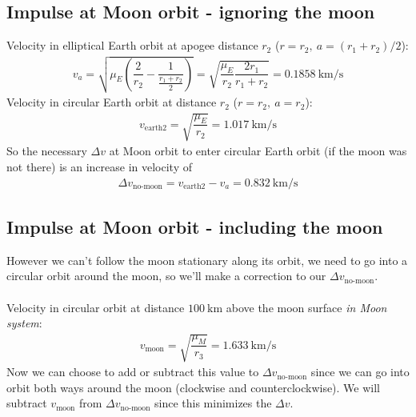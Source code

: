 \subsection{Impulse at Moon orbit - ignoring the moon}
Velocity in elliptical Earth orbit at apogee distance $r_2$ ($r = r_2,\ a = (r_1+r_2)/2$):
\begin{align}
v_a = \sqrt{\mu_E\left(\dfrac{2}{r_2} - \dfrac{1}{\frac{r_1+r_2}{2}}\right)} = \sqrt{\dfrac{\mu_E}{r_2} \dfrac{2 r_1}{r_1+r_2}} = \SI{0.1858}{\km\per\s} \label{eq:va}
\end{align}
Velocity in circular Earth orbit at distance $r_2$ ($r = r_2,\ a = r_2$):
\begin{align}
v_{\text{earth2}} = \sqrt{\dfrac{\mu_E}{r_2}} = \SI{1.017}{\km\per\s}
\end{align}
So the necessary $\Delta v$ at Moon orbit to enter circular Earth orbit (if the moon was not there) is an increase in velocity of
\begin{align}
\Delta v_{\text{no-moon}} = v_{\text{earth2}} - v_a = \SI{0.832}{\km\per\s}
\end{align}

\subsection{Impulse at Moon orbit - including the moon}
However we can't follow the moon stationary along its orbit, we need to go into a circular orbit around the moon, so we'll make a correction to our $\Delta v_{\text{no-moon}}$.\\
\\
Velocity in circular orbit at distance $\SI{100}{\km}$ above the moon surface \emph{in Moon system}:
\begin{align}
v_{\text{moon}} = \sqrt{\dfrac{\mu_M}{r_3}} = \SI{1.633}{\km\per\s}
\end{align}
Now we can choose to add or subtract this value to $\Delta v_{\text{no-moon}}$ since we can go into orbit both ways around the moon (clockwise and counterclockwise). We will subtract $v_{\text{moon}}$ from $\Delta v_{\text{no-moon}}$ since this minimizes the $\Delta v$.

